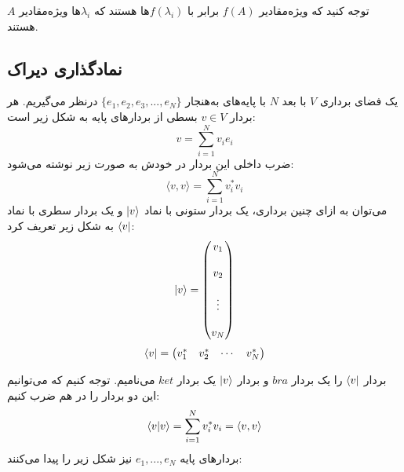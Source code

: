     توجه کنید که ویژه‌مقادیر $f(A)$ برابر با $f(\lambda_{i})$ها هستند که $\lambda_{i}$ها ویژه‌مقادیر $A$ هستند. 
    
      \subsection{نمادگذاری دیراک}
      یک فضای برداری $V$ با بعد $N$ با پایه‌های به‌هنجار $\{e_{1}, e_{2}, e_{3}, ... , e_{N}\}$ درنظر می‌گیریم. هر بردار $v \in V$ بسطی از بردارهای پایه به شکل زیر است: 
      \begin{equation}
      	v = \sum_{i=1}^{N} v_{i}e_{i}
      \end{equation}
      ضرب داخلی این بردار در خودش به صورت زیر نوشته می‌شود:
      \begin{equation}
      	\langle v,v \rangle = \sum_{i=1}^{N} v^{*}_{i} v_{i}
      \end{equation}
       می‌توان به ازای چنین برداری، یک بردار ستونی با نماد $\ket{v}$ و یک بردار سطری با نماد $\bra{v}$ به شکل زیر تعریف کرد:
       \begin{equation}
       	\ket{v} = \begin{pmatrix}
       		v_{1} \\ \\ v_{2} \\ \\ \vdots \\ \\ v_{N} 
       	\end{pmatrix}
       \end{equation}
       \begin{equation}
       	\bra{v} = \begin{pmatrix}
       		v^{*}_{1} & v^{*}_{2} & \cdots & v^{*}_{N} 
       	\end{pmatrix}
       \end{equation}
       
       بردار $\bra{v}$ را یک بردار $bra$ و بردار $\ket{v}$ یک بردار $ket$ می‌نامیم. توجه کنیم که ‌می‌توانیم این دو بردار را در هم ضرب کنیم:
       \begin{equation}
       		\bra{v}\ket{v} = \sum_{i=1}^{N} v^{*}_{i}v_{i} = \langle v,v \rangle
       \end{equation}
       بردار‌های پایه $e_{1}, ... , e_{N}$ نیز شکل زیر را پیدا می‌کنند:
       


